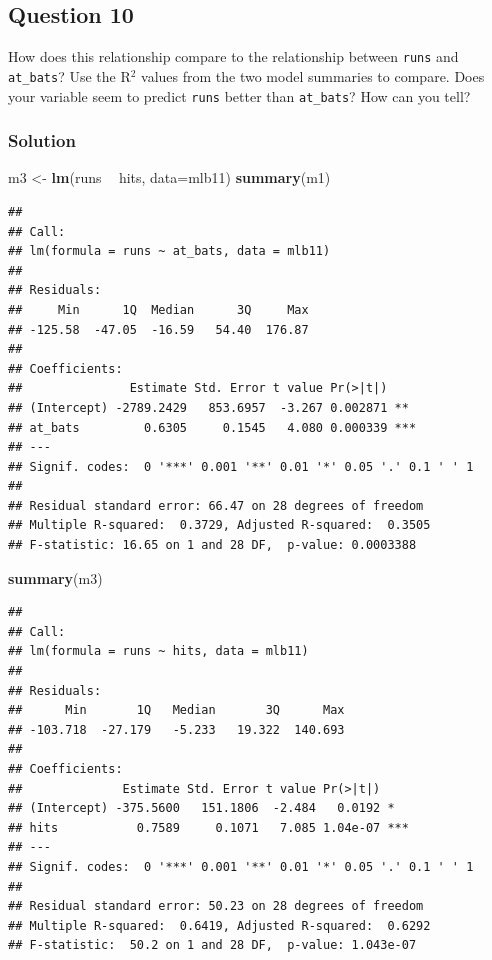 \documentclass[]{article}
\newenvironment{Shaded}{\begin{snugshade}}{\end{snugshade}}
\newcommand{\KeywordTok}[1]{\textcolor[rgb]{0.13,0.29,0.53}{\textbf{#1}}}
\newcommand{\DataTypeTok}[1]{\textcolor[rgb]{0.13,0.29,0.53}{#1}}
\newcommand{\StringTok}[1]{\textcolor[rgb]{0.31,0.60,0.02}{#1}}
\newcommand{\OperatorTok}[1]{\textcolor[rgb]{0.81,0.36,0.00}{\textbf{#1}}}
\newcommand{\NormalTok}[1]{#1}
\begin{document}
\subsection{Question 10}\label{question-10}

How does this relationship compare to the relationship between
\texttt{runs} and \texttt{at\_bats}? Use the R\(^2\) values from the two
model summaries to compare. Does your variable seem to predict
\texttt{runs} better than \texttt{at\_bats}? How can you tell?

\subsubsection{Solution}\label{solution-9}

\begin{Shaded}
\begin{Highlighting}[]
\NormalTok{m3 <-}\StringTok{ }\KeywordTok{lm}\NormalTok{(runs }\OperatorTok{~}\StringTok{ }\NormalTok{hits, }\DataTypeTok{data=}\NormalTok{mlb11)}
\KeywordTok{summary}\NormalTok{(m1)}
\end{Highlighting}
\end{Shaded}

\begin{verbatim}
## 
## Call:
## lm(formula = runs ~ at_bats, data = mlb11)
## 
## Residuals:
##     Min      1Q  Median      3Q     Max 
## -125.58  -47.05  -16.59   54.40  176.87 
## 
## Coefficients:
##               Estimate Std. Error t value Pr(>|t|)    
## (Intercept) -2789.2429   853.6957  -3.267 0.002871 ** 
## at_bats         0.6305     0.1545   4.080 0.000339 ***
## ---
## Signif. codes:  0 '***' 0.001 '**' 0.01 '*' 0.05 '.' 0.1 ' ' 1
## 
## Residual standard error: 66.47 on 28 degrees of freedom
## Multiple R-squared:  0.3729, Adjusted R-squared:  0.3505 
## F-statistic: 16.65 on 1 and 28 DF,  p-value: 0.0003388
\end{verbatim}

\begin{Shaded}
\begin{Highlighting}[]
\KeywordTok{summary}\NormalTok{(m3)}
\end{Highlighting}
\end{Shaded}

\begin{verbatim}
## 
## Call:
## lm(formula = runs ~ hits, data = mlb11)
## 
## Residuals:
##      Min       1Q   Median       3Q      Max 
## -103.718  -27.179   -5.233   19.322  140.693 
## 
## Coefficients:
##              Estimate Std. Error t value Pr(>|t|)    
## (Intercept) -375.5600   151.1806  -2.484   0.0192 *  
## hits           0.7589     0.1071   7.085 1.04e-07 ***
## ---
## Signif. codes:  0 '***' 0.001 '**' 0.01 '*' 0.05 '.' 0.1 ' ' 1
## 
## Residual standard error: 50.23 on 28 degrees of freedom
## Multiple R-squared:  0.6419, Adjusted R-squared:  0.6292 
## F-statistic:  50.2 on 1 and 28 DF,  p-value: 1.043e-07
\end{verbatim}
\end{document}
